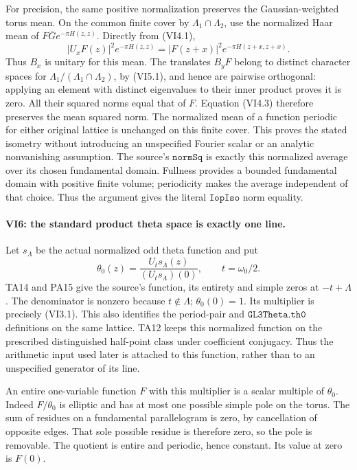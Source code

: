 For precision, the same positive normalization preserves the
Gaussian-weighted torus mean. On the common finite cover by
\(\Lambda_1\cap\Lambda_2\), use the normalized Haar mean of
\(F\overline G e^{-\pi H(z,z)}\). Directly from (VI4.1),
\[
 |U_xF(z)|^2e^{-\pi H(z,z)}
                 =|F(z+x)|^2e^{-\pi H(z+x,z+x)}.
 \tag{VI5.4}
\]
Thus \(B_x\) is unitary for this mean. The translates \(B_yF\)
belong to distinct character spaces for
\(\Lambda_1/(\Lambda_1\cap\Lambda_2)\), by (VI5.1), and hence
are pairwise orthogonal: applying an element with distinct
eigenvalues to their inner product proves it is zero.
All their squared norms equal that of \(F\). Equation (VI4.3)
therefore preserves the mean squared norm. The normalized mean
of a function periodic for either original lattice is unchanged
on this finite cover. This proves the stated isometry without
introducing an unspecified Fourier scalar or an analytic
nonvanishing assumption. The source's \(\texttt{normSq}\) is
exactly this normalized average over its chosen fundamental
domain. Fullness provides a bounded fundamental domain with
positive finite volume; periodicity makes the average independent
of that choice. Thus the argument gives the literal
\(\texttt{IopIso}\) norm equality.

\paragraph{VI6: the standard product theta space is exactly one line.}
Let \(s_\Lambda\) be the actual normalized odd theta function and
put
\[
 \theta_0(z)=\frac{U_t s_\Lambda(z)}{(U_t s_\Lambda)(0)},
 \qquad t=\omega_0/2.
 \tag{VI6.1}
\]
TA14 and PA15 give the source's function, its entirety and
simple zeros at \(-t+\Lambda\). The denominator is nonzero
because \(t\notin\Lambda\); \(\theta_0(0)=1\). Its multiplier
is precisely (VI3.1). This also identifies the period-pair
and \(\texttt{GL3Theta.th0}\) definitions on the same lattice.
TA12 keeps this normalized function on the prescribed
distinguished half-point class under coefficient conjugacy.
Thus the arithmetic input used later is attached to this
function, rather than to an unspecified generator of its line.

An entire one-variable function \(F\) with this multiplier
is a scalar multiple of \(\theta_0\). Indeed \(F/\theta_0\)
is elliptic and has at most one possible simple pole on the
torus. The sum of residues on a fundamental parallelogram is
zero, by cancellation of opposite edges. That sole possible
residue is therefore zero, so the pole is removable.
The quotient is entire and periodic, hence constant.
Its value at zero is \(F(0)\).

